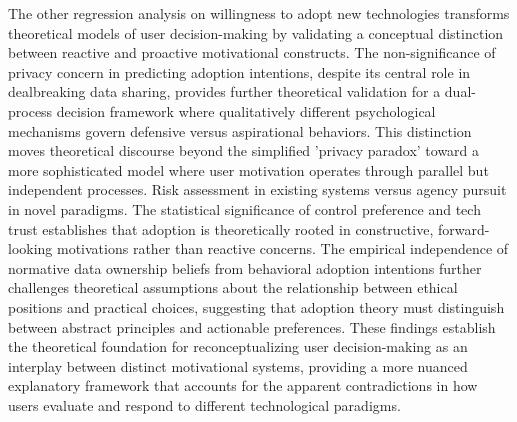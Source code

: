 	The other regression analysis on willingness to adopt new technologies transforms theoretical models of user decision-making by validating a conceptual distinction between reactive and proactive motivational constructs. The non-significance of privacy concern in predicting adoption intentions, despite its central role in dealbreaking data sharing, provides further theoretical validation for a dual-process decision framework where qualitatively different psychological mechanisms govern defensive versus aspirational behaviors. This distinction moves theoretical discourse beyond the simplified 'privacy paradox' toward a more sophisticated model where user motivation operates through parallel but independent processes. Risk assessment in existing systems versus agency pursuit in novel paradigms. The statistical significance of control preference and tech trust establishes that adoption is theoretically rooted in constructive, forward-looking motivations rather than reactive concerns. The empirical independence of normative data ownership beliefs from behavioral adoption intentions further challenges theoretical assumptions about the relationship between ethical positions and practical choices, suggesting that adoption theory must distinguish between abstract principles and actionable preferences. These findings establish the theoretical foundation for reconceptualizing user decision-making as an interplay between distinct motivational systems, providing a more nuanced explanatory framework that accounts for the apparent contradictions in how users evaluate and respond to different technological paradigms.

